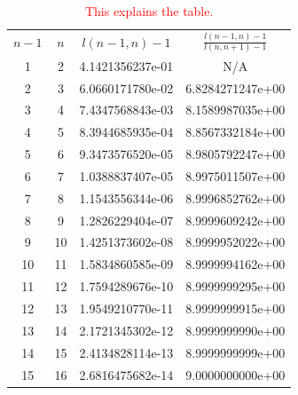 \documentclass[12pt,titlepage]{article}
\begin{document}
\begin{table}
\begin{center}
\begin{tabular}{| c | c | c | c |}
\hline
$n-1$ & $n$ & $l(n-1,n)-1$    & $\frac{l(n-1,n)-1}{l(n,n+1)-1}$ \\
\hhline{|=|=|=|=|}
  1 &   2 & 4.1421356237e-01 & N/A \\
\hline
  2 &   3 & 6.0660171780e-02 & 6.8284271247e+00 \\
\hline
  3 &   4 & 7.4347568843e-03 & 8.1589987035e+00 \\
\hline
  4 &   5 & 8.3944685935e-04 & 8.8567332184e+00 \\
\hline
  5 &   6 & 9.3473576520e-05 & 8.9805792247e+00 \\
\hline
  6 &   7 & 1.0388837407e-05 & 8.9975011507e+00 \\
\hline
  7 &   8 & 1.1543556344e-06 & 8.9996852762e+00 \\
\hline
  8 &   9 & 1.2826229404e-07 & 8.9999609242e+00 \\
\hline
  9 &  10 & 1.4251373602e-08 & 8.9999952022e+00 \\
\hline
 10 &  11 & 1.5834860585e-09 & 8.9999994162e+00 \\
\hline
 11 &  12 & 1.7594289676e-10 & 8.9999999295e+00 \\
\hline
 12 &  13 & 1.9549210770e-11 & 8.9999999915e+00 \\
\hline
 13 &  14 & 2.1721345302e-12 & 8.9999999990e+00 \\
\hline
 14 &  15 & 2.4134828114e-13 & 8.9999999999e+00 \\
\hline
 15 &  16 & 2.6816475682e-14 & 9.0000000000e+00 \\
\hline
\end{tabular}
\end{center}
\vspace{-0.2in}
\caption{\textcolor{red}{This explains the table.}}
\end{table}
\end{document}

